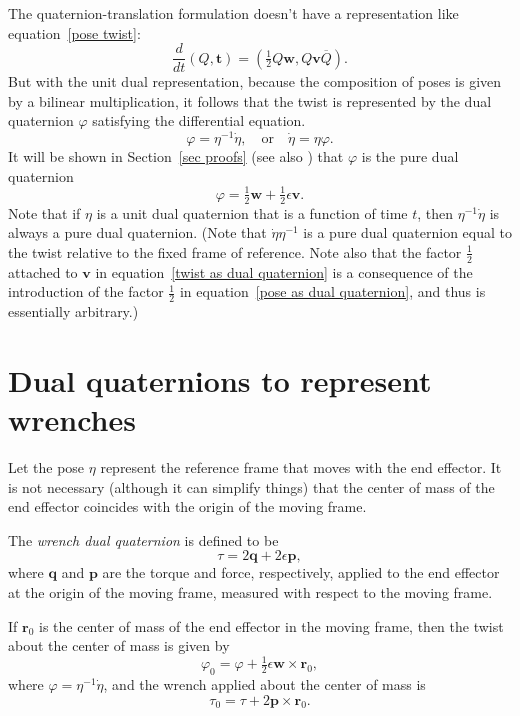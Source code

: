 \documentclass[reqno,12pt]{amsart}
\begin{document}
The quaternion-translation formulation doesn't have a representation like equation~\eqref{pose twist}:
\begin{equation}
\frac d{dt} (Q, \bm t) = \left(\tfrac12 Q \bm w, Q \bm v \overline Q \right).
\end{equation}
But with the unit dual representation, because the composition of poses is given by a bilinear multiplication, it follows that the twist is represented by the dual quaternion $\varphi$ satisfying the differential equation.
\begin{equation}
\label{ode dual quaternion}
\varphi = \eta^{-1} \dot \eta, \quad\text{or}\quad\dot \eta = \eta \varphi .
\end{equation}
It will be shown in Section~\ref{sec proofs} (see also \cite{han-et-al}) that $\varphi$ is the pure dual quaternion
\begin{equation}
\label{twist as dual quaternion}
\varphi = \tfrac12 \bm w + \tfrac12 \epsilon \bm v .
\end{equation}
Note that if $\eta$ is a unit dual quaternion that is a function of time $t$, then $\eta^{-1} \dot \eta$ is always a pure dual quaternion.  (Note that $\dot\eta\eta^{-1}$ is a pure dual quaternion equal to the twist relative to the fixed frame of reference.  Note also that the factor $\tfrac12$ attached to $\bm v$ in equation~\eqref{twist as dual quaternion} is a consequence of the introduction of the factor $\tfrac12$ in equation~\eqref{pose as dual quaternion}, and thus is essentially arbitrary.)

\section{Dual quaternions to represent wrenches}

Let the pose $\eta$ represent the reference frame that moves with the end effector.  It is not necessary (although it can simplify things) that the center of mass of the end effector coincides with the origin of the moving frame.

The \emph{wrench dual quaternion} is defined to be
\begin{equation}
\label{wrench as quaternion}
\tau = 2 \bm q + 2 \epsilon \bm p,
\end{equation}
where $\bm q$ and $\bm p$ are the torque and force, respectively, applied to the end effector at the origin of the moving frame, measured with respect to the moving frame.

If $\bm r_0$ is the center of mass of the end effector in the moving frame, then the twist about the center of mass is given by
\begin{equation}
\label{twist correction}
\varphi_0 = 
\varphi + \tfrac12\epsilon\bm w \times \bm r_0,
\end{equation}
where $\varphi = \eta^{-1} \dot \eta$, and the wrench applied about the center of mass is
\begin{equation}
\label{torque correction}
\tau_0 = 
\tau + 2 \bm p \times \bm r_0.
\end{equation}
\end{document}
